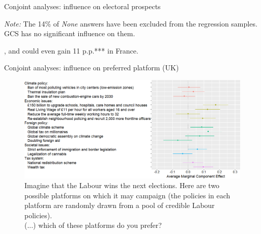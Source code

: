\documentclass[aspectratio=169,xcolor=dvipsnames, 11pt,mathserif]{beamer}
\begin{document}
\begin{frame}{Conjoint analyses: influence on electoral prospects\label{conjoint_c} \hyperlink{support}{}}
{\begin{table}[h]
        \makebox[\textwidth][c]{}
        {\footnotesize \textit{Note:} The 14\% of \textit{None} answers have been excluded from the regression samples. GCS has no significant influence on them. }
      \end{table} \vspace*{-.2cm}
      \bbvs \ip {}, and could even gain 11 p.p.*** in France.
      \ee
      }
\end{frame}

\begin{frame}{Conjoint analyses: influence on preferred platform (UK)\label{conjoint_r_uk} \hyperlink{support}{}} 
    \begin{figure}\vspace{-.2cm}
        \centering 
        \caption{Imagine that the Labour wins the next elections. Here are two possible platforms on which it may campaign (the policies in each platform are randomly drawn from a pool of credible Labour policies).\\
		(...) %
        which of these platforms do you prefer? %
        }
        \vspace{-.2cm} 
        \includegraphics[height=.77\textheight]{../figures/UK/ca_r.png} 
    \end{figure}
\end{frame}
\end{document}
